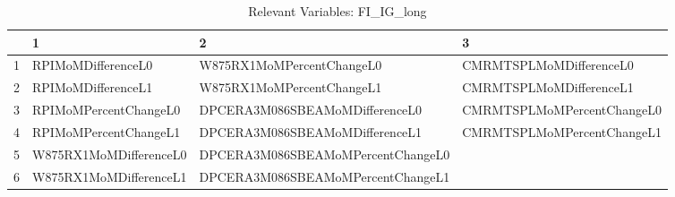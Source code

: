 \begin{longtable}{rlll}
\caption{Relevant Variables: FI_IG_long} \\ 
  \hline
 & 1 & 2 & 3 \\ 
  \hline
1 & RPIMoMDifferenceL0 & W875RX1MoMPercentChangeL0 & CMRMTSPLMoMDifferenceL0 \\ 
  2 & RPIMoMDifferenceL1 & W875RX1MoMPercentChangeL1 & CMRMTSPLMoMDifferenceL1 \\ 
  3 & RPIMoMPercentChangeL0 & DPCERA3M086SBEAMoMDifferenceL0 & CMRMTSPLMoMPercentChangeL0 \\ 
  4 & RPIMoMPercentChangeL1 & DPCERA3M086SBEAMoMDifferenceL1 & CMRMTSPLMoMPercentChangeL1 \\ 
  5 & W875RX1MoMDifferenceL0 & DPCERA3M086SBEAMoMPercentChangeL0 &  \\ 
  6 & W875RX1MoMDifferenceL1 & DPCERA3M086SBEAMoMPercentChangeL1 &  \\ 
   \hline
\hline
\end{longtable}
